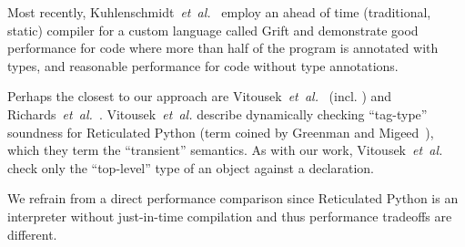 
Most recently, Kuhlenschmidt~\textit{et~al.}~\cite{Kuhlenschmidt:2018:preprint} employ an
ahead of time (\ie traditional, static) compiler for a custom
language called Grift and demonstrate good performance for code where more than
half of the program is annotated with types, and reasonable
performance for code without type annotations.

\label{reticRW}
Perhaps the closest to our approach are
Vitousek~\textit{et~al.}~\cite{reticPython2014} (incl. \citep{Vitousek2017,Greenman2018})
and Richards~\textit{et~al.}~\cite{Richards2017}.
Vitousek~\textit{et~al.} describe dynamically checking ``tag-type''
soundness for Reticulated Python (term coined by Greenman
and Migeed~\cite{Greenman2018}), which they term the ``transient'' semantics.
As with our work, Vitousek~\textit{et~al.} check only the ``top-level'' type of an
object against a declaration.

%
We refrain from a direct performance comparison since
Reticulated Python is an interpreter without just-in-time compilation
and thus performance tradeoffs are different.

